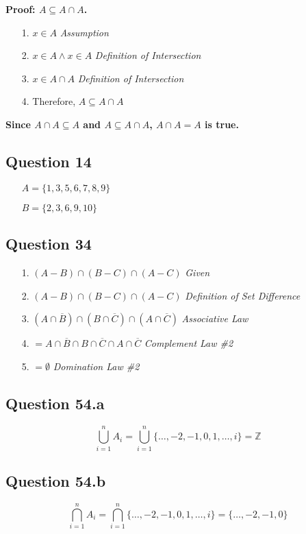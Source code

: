 \documentclass{article}
\begin{document}
\textbf{Proof: $A \subseteq A \cap A$.}
\begin{itemize}
    \item[1.] \( x \in A \) \hfill \textit{Assumption}
    \item[2.] \( x \in A \land x \in A \) \hfill \textit{Definition of Intersection}
    \item[3.] \( x \in A \cap A \) \hfill \textit{Definition of Intersection}
    \item[4.] Therefore, $A \subseteq A \cap A$
\end{itemize}

\textbf{Since $A \cap A \subseteq A$ and $A \subseteq A \cap A$, $A \cap A = A$ is true.}

\subsection*{Question 14}
\begin{itemize}
    \item[] \( A = \{1, 3, 5, 6, 7, 8, 9\} \)
    \item[] \( B = \{2, 3, 6, 9, 10\} \)
\end{itemize}

\subsection*{Question 34}
\begin{itemize}
    \item[1.] \( (A - B) \cap (B - C) \cap (A - C) \) \hfill \textit{Given}
    \item[2.] \( (A - B) \cap (B - C) \cap (A - C) \) \hfill \textit{Definition of Set Difference}
    \item[3.] \((A \cap \overline{B}) \cap (B \cap \overline{C}) \cap (A \cap \overline{C}) \) \hfill \textit{Associative Law}
    \item[4.] \( = A \cap \overline{B} \cap B \cap \overline{C} \cap A \cap \overline{C} \) \hfill \textit{Complement Law \#2}
    \item[5.] \( = \emptyset \) \hfill \textit{Domination Law \#2}
\end{itemize}


\subsection*{Question 54.a}
\[
\bigcup_{i=1}^n A_i = \bigcup_{i=1}^n \{\ldots, -2, -1, 0, 1, \ldots, i\} = \mathbb{Z}
\]

\subsection*{Question 54.b}
\[
\bigcap_{i=1}^n A_i = \bigcap_{i=1}^n \{\ldots, -2, -1, 0, 1, \ldots, i\} = \{\ldots, -2, -1, 0\}
\]
\end{document}
